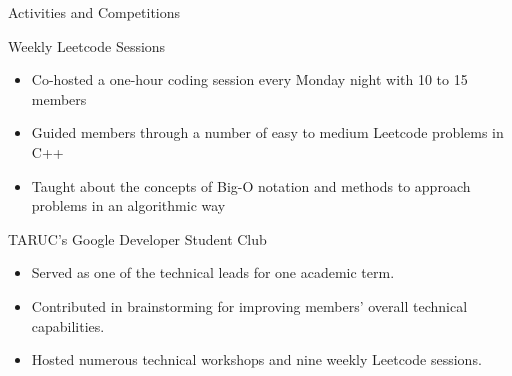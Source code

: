 \documentclass{article}
\newlength{\tabin}
\newlength{\secsep}
\newcommand{\lineunder}{\vspace*{-8pt} \\ \hspace*{-6pt} \hrulefill \\ \vspace*{-15pt}}
\newenvironment{tabbedsection}[1]{
  \begin{list}{}{
      \setlength{\itemsep}{0pt}
      \setlength{\labelsep}{0pt}
      \setlength{\labelwidth}{0pt}
      \setlength{\leftmargin}{\tabin}
      \setlength{\rightmargin}{\tabin}
      \setlength{\listparindent}{0pt}
      \setlength{\parsep}{0pt}
      \setlength{\parskip}{0pt}
      \setlength{\partopsep}{0pt}
      \setlength{\topsep}{#1}
    }
  \item[]
}{\end{list}}
\newenvironment{resume_section}[1]{
  \filbreak
  \vspace{2\secsep}
  \textsc{\large#1}
  \lineunder
  \begin{tabbedsection}{\secsep}
}{\end{tabbedsection}}
\newenvironment{resume_subsection}[2][]{
  \textbf{#2} \hfill {\footnotesize #1} \hspace{2em}
  \begin{tabbedsection}{0.5\secsep}
}{\end{tabbedsection}}
\newenvironment{subitems}{
  \renewcommand{\labelitemi}{-}
  \begin{itemize}
      \setlength{\labelsep}{1em}
}{\end{itemize}}
\begin{document}
\begin{resume_section}{Activities and Competitions}

  \begin{resume_subsection}{{Weekly Leetcode Sessions}}
    \begin{subitems}
      \item Co-hosted a one-hour coding session every Monday night with 10 to 15 members
      \item Guided members through a number of easy to medium Leetcode problems in C++
      \item Taught about the concepts of Big-O notation and methods to approach problems in an algorithmic way
    \end{subitems}
  \end{resume_subsection}


  \begin{resume_subsection}{{TARUC's Google Developer Student Club}}
    \begin{subitems}
      \item Served as one of the technical leads for one academic term.
      \item Contributed in brainstorming for improving members' overall technical capabilities.
      \item Hosted numerous technical workshops and nine weekly Leetcode sessions.
    \end{subitems}
  \end{resume_subsection}


\end{resume_section}
\end{document}
